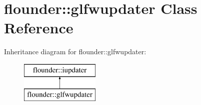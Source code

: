 \hypertarget{classflounder_1_1glfwupdater}{}\section{flounder\+:\+:glfwupdater Class Reference}
\label{classflounder_1_1glfwupdater}
Inheritance diagram for flounder\+:\+:glfwupdater\+:\begin{figure}[H]
\begin{center}
\leavevmode
\includegraphics[height=2.000000cm]{classflounder_1_1glfwupdater}
\end{center}
\end{figure}
